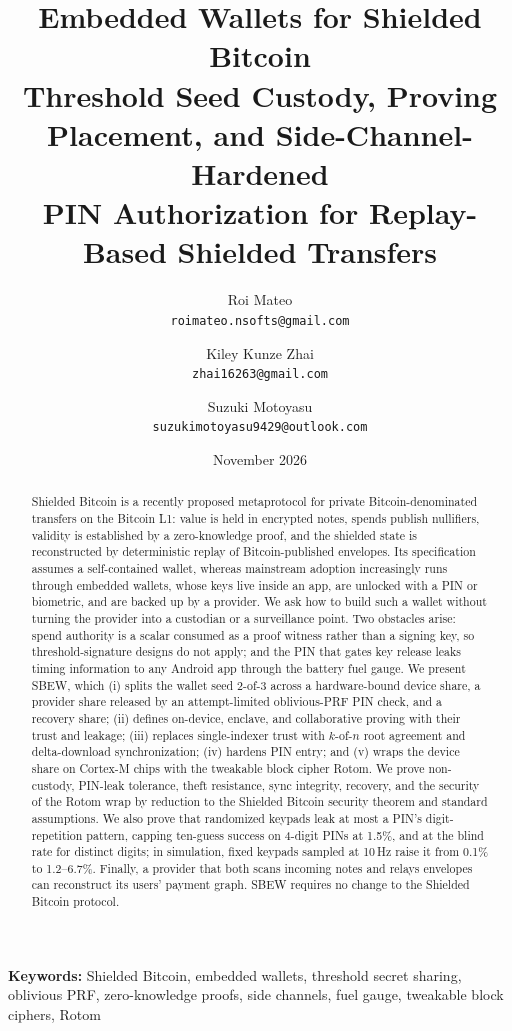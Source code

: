 \documentclass[11pt]{article}
\title{\textbf{Embedded Wallets for Shielded Bitcoin}\\[4pt]
\large Threshold Seed Custody, Proving Placement, and Side-Channel-Hardened\\ PIN Authorization for Replay-Based Shielded Transfers}
\author{Roi Mateo\\ \small\texttt{roimateo.nsofts@gmail.com} \and Kiley Kunze Zhai\\ \small\texttt{zhai16263@gmail.com} \and Suzuki Motoyasu\\ \small\texttt{suzukimotoyasu9429@outlook.com}}
\date{\small November 2026}
\theoremstyle{remark}
\newcommand{\SB}{Shielded Bitcoin}
\newcommand{\sysname}{\textsf{SBEW}}
\begin{document}
\maketitle

\begin{abstract}
\SB{} is a recently proposed metaprotocol for private Bitcoin-denominated transfers on the Bitcoin L1: value is held in encrypted notes, spends publish nullifiers, validity is established by a zero-knowledge proof, and the shielded state is reconstructed by deterministic replay of Bitcoin-published envelopes. Its specification assumes a self-contained wallet, whereas mainstream adoption increasingly runs through embedded wallets, whose keys live inside an app, are unlocked with a PIN or biometric, and are backed up by a provider. We ask how to build such a wallet without turning the provider into a custodian or a surveillance point. Two obstacles arise: spend authority is a scalar consumed as a proof witness rather than a signing key, so threshold-signature designs do not apply; and the PIN that gates key release leaks timing information to any Android app through the battery fuel gauge. We present \sysname{}, which (i) splits the wallet seed 2-of-3 across a hardware-bound device share, a provider share released by an attempt-limited oblivious-PRF PIN check, and a recovery share; (ii) defines on-device, enclave, and collaborative proving with their trust and leakage; (iii) replaces single-indexer trust with $k$-of-$n$ root agreement and delta-download synchronization; (iv) hardens PIN entry; and (v) wraps the device share on Cortex-M chips with the tweakable block cipher Rotom. We prove non-custody, PIN-leak tolerance, theft resistance, sync integrity, recovery, and the security of the Rotom wrap by reduction to the \SB{} security theorem and standard assumptions. We also prove that randomized keypads leak at most a PIN's digit-repetition pattern, capping ten-guess success on 4-digit PINs at 1.5\%, and at the blind rate for distinct digits; in simulation, fixed keypads sampled at 10\,Hz raise it from 0.1\% to 1.2--6.7\%. Finally, a provider that both scans incoming notes and relays envelopes can reconstruct its users' payment graph. \sysname{} requires no change to the \SB{} protocol.
\end{abstract}

\noindent\textbf{Keywords:} Shielded Bitcoin, embedded wallets, threshold secret sharing, oblivious PRF, zero-knowledge proofs, side channels, fuel gauge, tweakable block ciphers, Rotom
\end{document}
